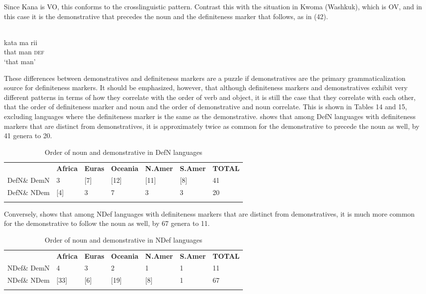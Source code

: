 \documentclass[output=paper]{langsci/langscibook}
\begin{document}
Since Kana is VO, this conforms to the crosslinguistic pattern. Contrast this with the situation in Kwoma (Washkuk), which is OV, and in this case it is the demonstrative that precedes the noun and the definiteness marker that follows, as in (42).

\ea\label{ex:dryer:}
\\
\gll   kata  ma  rii\\
       that  man  \textsc{def}\\
\glt   ‘that man’
\z

These differences between demonstratives and definiteness markers are a puzzle if demonstratives are the primary grammaticalization source for definiteness markers. It should be emphasized, however, that although definiteness markers and demonstratives exhibit very different patterns in terms of how they correlate with the order of verb and object, it is still the case that they correlate with each other, that the order of definiteness marker and noun and the order of demonstrative and noun correlate. This is shown in Tables 14 and 15, excluding languages where the definiteness marker is the same as the demonstrative.  shows that among DefN languages with definiteness markers that are distinct from demonstratives, it is approximately twice as common for the demonstrative to precede the noun as well, by 41 genera to 20.

\begin{table}
\begin{tabularx}{\textwidth}{XXXXXXX}
\lsptoprule
& \bfseries Africa & \bfseries Euras & \bfseries Oceania & \bfseries N.Amer & \bfseries S.Amer & \bfseries TOTAL\\
DefN\& DemN & 3 & [7] & [12] & [11] & [8] & 41\\
DefN\& NDem & [4] & 3 & 7 & 3 & 3 & 20\\
\lspbottomrule
\end{tabularx}
\caption{\label{tab:dryer:14}Order of noun and demonstrative in DefN languages}
\end{table}

Conversely,  shows that among NDef languages with definiteness markers that are distinct from demonstratives, it is much more common for the demonstrative to follow the noun as well, by 67 genera to 11.

\begin{table}
\begin{tabularx}{\textwidth}{XXXXXXX}
& \bfseries Africa & \bfseries Euras & \bfseries Oceania & \bfseries N.Amer & \bfseries S.Amer & \bfseries TOTAL\\
\lsptoprule
NDef\& DemN & 4 & 3 & 2 & 1 & 1 & 11\\
NDef\& NDem & [33] & [6] & [19] & [8] & 1 & 67\\
\lspbottomrule
\end{tabularx}
\caption{\label{tab:dryer:15}Order of noun and demonstrative in NDef languages}
\end{table}
\end{document}

